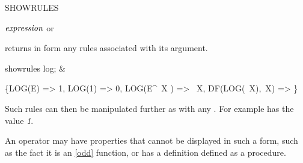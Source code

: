 \begin{Operator}[showrules]{SHOWRULES}
\begin{Syntax}
\(\meta{expression}\) or
  
\end{Syntax}

 returns in  form any 
 rules associated with its argument.

\begin{Examples}
showrules log; &
\begin{multilineoutput}{6cm}
\{LOG(E) => 1,
 LOG(1) => 0,
 LOG(E^{~X} ) => ~X,
 DF(LOG(~X),~X) => \}
\end{multilineoutput}
\end{Examples}

Such rules can then be manipulated further as with any .  For
example
 has the value {\em 1}.

\begin{Comments}
An operator may have properties that cannot be displayed in such a form,
such as the fact it is an \ref{odd} function, or has a definition defined
as a procedure.
\end{Comments}
\end{Operator}


